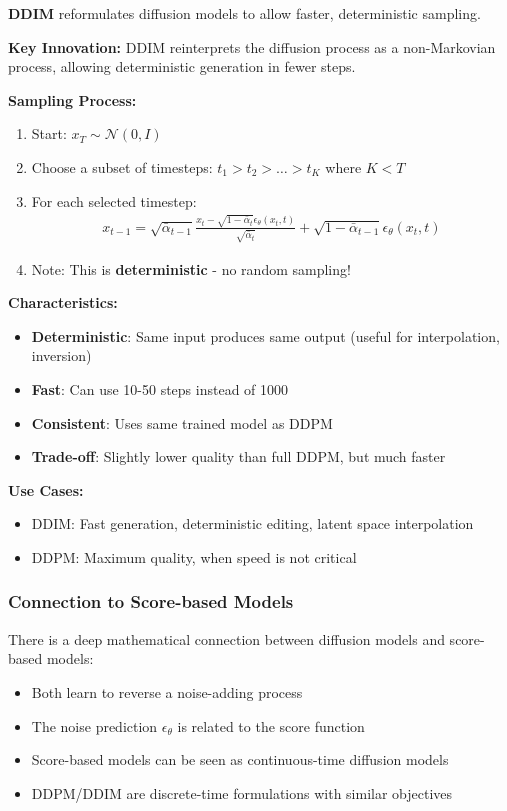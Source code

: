 \documentclass[12pt,a4paper]{article}
\begin{document}
\textbf{DDIM} reformulates diffusion models to allow faster, deterministic sampling.

\textbf{Key Innovation:} DDIM reinterprets the diffusion process as a non-Markovian process, allowing deterministic generation in fewer steps.

\textbf{Sampling Process:}
\begin{enumerate}
    \item Start: $x_T \sim \mathcal{N}(0, I)$
    \item Choose a subset of timesteps: $t_1 > t_2 > \ldots > t_K$ where $K < T$
    \item For each selected timestep:
    \begin{align}
        x_{t-1} = \sqrt{\bar{\alpha}_{t-1}} \frac{x_t - \sqrt{1-\bar{\alpha}_t}\epsilon_\theta(x_t, t)}{\sqrt{\bar{\alpha}_t}} + \sqrt{1-\bar{\alpha}_{t-1}} \epsilon_\theta(x_t, t)
    \end{align}
    \item Note: This is \textbf{deterministic} - no random sampling!
\end{enumerate}

\textbf{Characteristics:}
\begin{itemize}
    \item \textbf{Deterministic}: Same input produces same output (useful for interpolation, inversion)
    \item \textbf{Fast}: Can use 10-50 steps instead of 1000
    \item \textbf{Consistent}: Uses same trained model as DDPM
    \item \textbf{Trade-off}: Slightly lower quality than full DDPM, but much faster
\end{itemize}

\textbf{Use Cases:}
\begin{itemize}
    \item DDIM: Fast generation, deterministic editing, latent space interpolation
    \item DDPM: Maximum quality, when speed is not critical
\end{itemize}

\subsubsection{Connection to Score-based Models}

There is a deep mathematical connection between diffusion models and score-based models:
\begin{itemize}
    \item Both learn to reverse a noise-adding process
    \item The noise prediction $\epsilon_\theta$ is related to the score function
    \item Score-based models can be seen as continuous-time diffusion models
    \item DDPM/DDIM are discrete-time formulations with similar objectives
\end{itemize}
\end{document}
